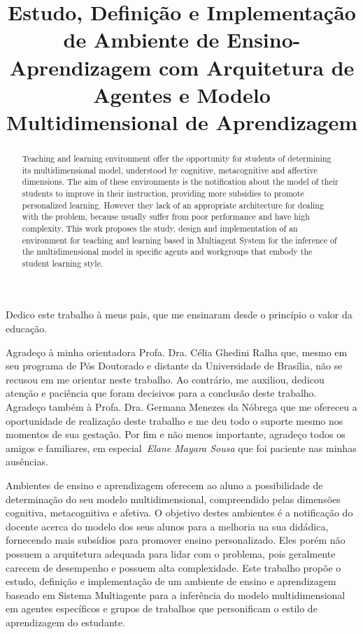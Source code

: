 \documentclass[bacharelado]{unb-cic}
\title{Estudo, Definição e Implementação de Ambiente de Ensino-Aprendizagem com Arquitetura de Agentes e Modelo Multidimensional de Aprendizagem}
\begin{document}
  \maketitle

  \begin{dedicatoria}
  Dedico este trabalho à meus pais, que me ensinaram desde o princípio o valor da educação.
  \end{dedicatoria}

  \begin{agradecimentos}
  Agradeço à minha orientadora Profa. Dra. Célia Ghedini Ralha que, mesmo em seu programa de Pós Doutorado e distante da Universidade de Brasília, não se recusou em me orientar neste trabalho. Ao contrário, me auxiliou, dedicou atenção e paciência que foram decisivos para a conclusão deste trabalho.
  Agradeço também à Profa. Dra. Germana Menezes da Nóbrega que me ofereceu a oportunidade de realização deste trabalho e me deu todo o suporte mesmo nos momentos de sua gestação.
  Por fim e não menos importante, agradeço todos os amigos e familiares, em especial~\emph{Elane Mayara Sousa} que foi paciente nas minhas ausências.
  \end{agradecimentos}

  \begin{resumo}
  Ambientes de ensino e aprendizagem oferecem ao aluno a possibilidade de determinação do seu modelo multidimensional, compreendido pelas dimensões cognitiva, metacognitiva e afetiva. O objetivo destes ambientes é a notificação do docente acerca do modelo dos seus alunos para a melhoria na sua didádica, fornecendo mais subsídios para promover ensino personalizado. Eles porém não possuem a arquitetura adequada para lidar com o problema, pois geralmente carecem de desempenho e possuem alta complexidade. 
  Este trabalho propõe o estudo, definição e implementação de um ambiente de ensino e aprendizagem baseado em Sistema Multiagente para a inferência do modelo multidimensional em agentes específicos e grupos de trabalhos que personificam o estilo de aprendizagem do estudante.
  \end{resumo}

  \begin{abstract}
  Teaching and learning environment offer the opportunity for students of determining its multidimensional model, understood by cognitive, metacognitive and affective dimensions. The aim of these environments is the notification about the model of their students to improve in their instruction, providing more subsidies to promote personalized learning. However they lack of an appropriate architecture for dealing with the problem, because usually suffer from poor performance and have high complexity.
  This work proposes the study, design and implementation of an environment for teaching and learning based in Multiagent System for the inference of the multidimensional model in specific agents and workgroups that embody the student learning style.
  \end{abstract}
\end{document}
